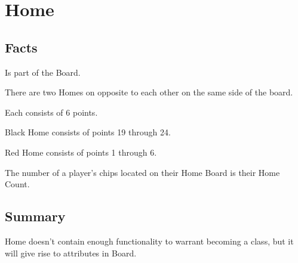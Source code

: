\section{Home}

\subsection{Facts}

\begin{dashed}
    \item Is part of the Board.
    \item There are two Homes on opposite to each other on the same side of the board.
    \item Each consists of 6 points.
    \item Black Home consists of points 19 through 24.
    \item Red Home consists of points 1 through 6.
    \item The number of a player’s chips located on their Home Board is their Home Count.
\end{dashed}

\subsection{Summary}
Home doesn't contain enough functionality to warrant becoming a class, but it will give rise to attributes in Board.

